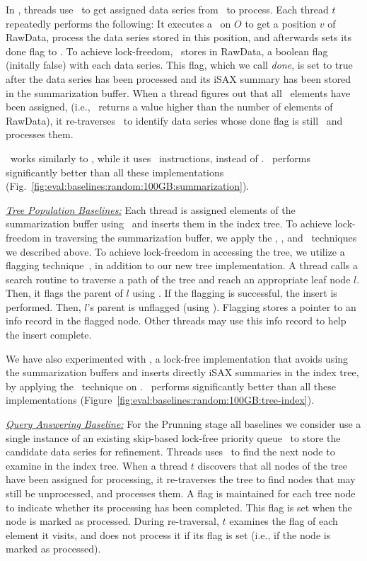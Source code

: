 In \FI, threads use \FAI\ to get assigned data series from \RawData\ to process.  
Each thread $t$ repeatedly performs the following:
It executes a \FAI\ on $O$ to get a position $v$ of RawData,
process the data series stored in this position, and afterwards sets its done flag to \True.
To achieve lock-freedom, \FI\ stores in RawData, a boolean flag (initally false) with each data series. 
This flag, which we call {\em done}, is set to true after the data series has been processed and its iSAX summary 
has been stored in the summarization buffer. 
When a thread figures out that all \RawData\ elements have been assigned,
(i.e., \FAI\ returns a value higher than the number of elements of RawData), 
it re-traverses \RawData\ to identify data series whose done flag is still \False\
and processes them. 

\CASBased\ works similarly to \FI, while it uses \CAS\ instructions, instead
of \FAI.
%
\Fresh\ performs significantly better than all these implementations
(Fig.~\ref{fig:eval:baselines:random:100GB:summarization}).


\noindent
{\emph{\underline{Tree Population Baselines:}}}
Each thread is assigned elements of the summarization buffer using \FAI\
and inserts them in the index tree. 
To achieve lock-freedom in traversing the summarization buffer, 
we apply the \DoAllSplit, \FI, and \CASBased\ techniques we described above.
%
To achieve lock-freedom in accessing the tree, we utilize a flagging technique~\cite{EFR+10},
in addition to our new tree implementation. 
A thread calls a search routine to traverse a path of the tree and reach an appropriate leaf
node $l$. Then, it flags the parent of $l$ using \CAS. If the flagging is successful, the insert
is performed. Then, $l$'s parent is unflagged (using \CAS).
Flagging stores a pointer to an info record in the flagged node.
Other threads may use this info record to help the insert complete. 

We have also experimented with \FINoSum, a lock-free implementation that 
avoids using the summarization buffers and inserts directly iSAX summaries in the index tree, 
by applying the \FI\ technique on \RawData.
%
\Fresh\ performs significantly better than all these implementations
(Figure~\ref{fig:eval:baselines:random:100GB:tree-index}).


\noindent
{\emph{\underline{Query Answering Baseline:}}}
For the Prunning stage all baselines we consider use a single instance of an 
existing skip-based lock-free priority queue~\cite{LJ13} to store the candidate
data series for refinement.
Threads uses \FAI\ to find the next node to examine in the index tree.
When a thread $t$ discovers that all nodes of the tree have been assigned for
processing, it re-traverses the tree to find nodes that may still  be
unprocessed, and processes them. 
A flag is maintained for each tree node to indicate whether its
processing has been completed. This flag is set when the node is marked as
processed. During re-traversal, $t$ examines
the flag of each element it visits, and does not process it if 
its flag is set (i.e., if the node is marked as processed).

